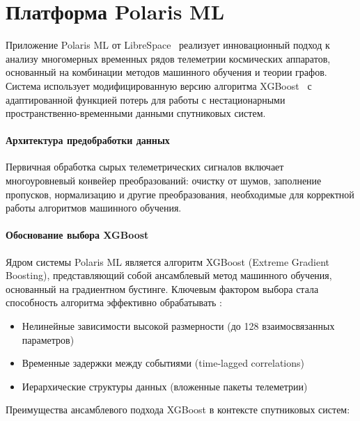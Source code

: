 \chapter{Платформа Polaris ML}

Приложение Polaris ML от LibreSpace~\cite{librespace_docs} реализует
инновационный подход к анализу многомерных временных рядов телеметрии
космических аппаратов, основанный на комбинации методов машинного обучения и
теории графов. Система использует модифицированную версию алгоритма
XGBoost~\cite{xgboost_docs} с адаптированной функцией потерь для работы с
нестационарными пространственно-временными данными спутниковых систем.

\subsubsection{Архитектура предобработки данных}

Первичная обработка сырых телеметрических сигналов включает многоуровневый
конвейер преобразований: очистку от шумов, заполнение пропусков, нормализацию и
другие преобразования, необходимые для корректной работы алгоритмов машинного
обучения.

\subsubsection{Обоснование выбора XGBoost}

Ядром системы Polaris ML является алгоритм XGBoost (Extreme Gradient Boosting),
представляющий собой ансамблевый метод машинного обучения, основанный на
градиентном бустинге. Ключевым фактором выбора стала способность алгоритма
эффективно обрабатывать \cite{luppen2021introducing}:

\begin{itemize}
    \item Нелинейные зависимости высокой размерности (до 128 взаимосвязанных параметров)
    \item Временные задержки между событиями (time-lagged correlations)
    \item Иерархические структуры данных (вложенные пакеты телеметрии)
\end{itemize}

Преимущества ансамблевого подхода XGBoost в контексте спутниковых систем:

